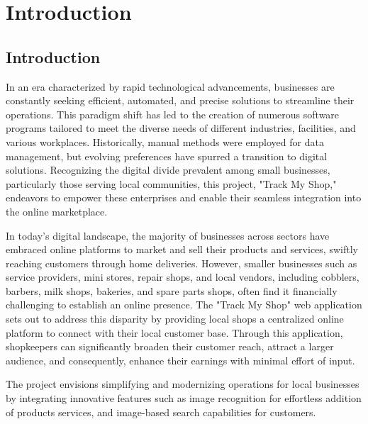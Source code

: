 
\chapter{Introduction} %

\label{Chapter1} %



\section{Introduction}
In an era characterized by rapid technological advancements, businesses are constantly seeking efficient, automated, and precise solutions to streamline their operations. This paradigm shift has led to the creation of numerous software programs tailored to meet the diverse needs of different industries, facilities, and various workplaces. Historically, manual methods were employed for data management, but evolving preferences have spurred a transition to digital solutions. Recognizing the digital divide prevalent among small businesses, particularly those serving local communities, this project, "Track My Shop," endeavors to empower these enterprises and enable their seamless integration into the online marketplace.

In today's digital landscape, the majority of businesses across sectors have embraced online platforms to market and sell their products and services, swiftly reaching customers through home deliveries. However, smaller businesses such as service providers, mini stores, repair shops, and local vendors, including cobblers, barbers, milk shops, bakeries, and spare parts shops, often find it financially challenging to establish an online presence. The "Track My Shop" web application sets out to address this disparity by providing local shops a centralized online platform to connect with their local customer base. Through this application, shopkeepers can significantly broaden their customer reach, attract a larger audience, and consequently, enhance their earnings with minimal effort of input.

The project envisions simplifying and modernizing operations for local businesses by integrating innovative features such as image recognition for effortless addition of products services, and image-based search capabilities for customers.

